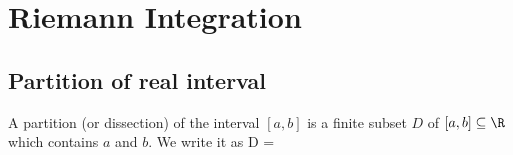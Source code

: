 








\section{Riemann Integration}



\subsection{Partition of real interval}

\begin{definition}\label{def:partition_real_interval}
A partition (or dissection) of the interval $[a,b]$ is a finite subset $D$ of $[a,b]\subseteq \R$ which contains $a$ and $b$. We write it as
\be
D = 
\ee
\end{definition}


%
%
%
%
%
%
%
%

